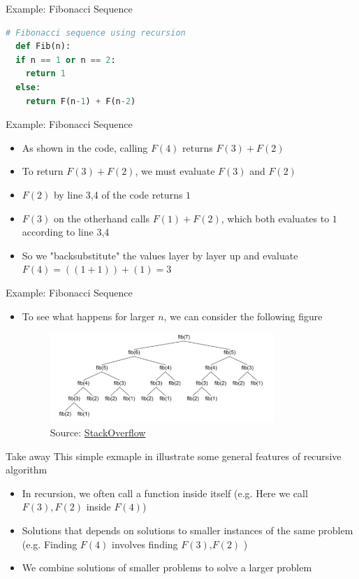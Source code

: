 \documentclass[10pt,xcolor={table,dvipsnames},t]{beamer}
\begin{document}
\begin{frame}[fragile]{Example: Fibonacci Sequence}
\begin{lstlisting}[language=python]
# Fibonacci sequence using recursion
  def Fib(n):
  if n == 1 or n == 2:
    return 1
  else:
    return F(n-1) + F(n-2)
\end{lstlisting}
\end{frame}

\begin{frame}{Example: Fibonacci Sequence}
  \begin{itemize}
    \item As shown in the code, calling $F(4)$ returns $F(3)+F(2)$ 
    \item To return $F(3)+F(2)$, we must evaluate $F(3)$ and $F(2)$
    \item $F(2)$ by line 3,4 of the code returns $1$
    \item $F(3)$ on the otherhand calls $F(1)+F(2)$, which both evaluates to $1$ according to line 3,4
    \item So we "backsubstitute" the values layer by layer up and evaluate $F(4) = ((1+1)) + (1) = 3$
  \end{itemize}
\end{frame}

\begin{frame}{Example: Fibonacci Sequence}
  \begin{itemize}
    \item To see what happens for larger $n$, we can consider the following figure
    \begin{figure}
      \centering
      \includegraphics[width=0.8\textwidth]{img/fib-tree.png}      
      \caption*{Source: \href{https://stackoverflow.com/questions/35959100/explanation-on-fibonacci-recursion}{StackOverflow}}
    \end{figure}
  \end{itemize}
\end{frame}

\begin{frame}{Take away}
  This simple exmaple in illustrate some general features of recursive algorithm
  \begin{itemize}
    \item In recursion, we often call a function inside itself (e.g. Here we call $F(3),F(2)$ inside $F(4)$)
    \item Solutions that depends on solutions to
    smaller instances of the same problem (e.g. Finding $F(4)$ involves finding $F(3)$,$F(2)$ )
    \item We combine solutions of smaller problems to solve a larger problem 
  \end{itemize}
\end{frame}
\end{document}
